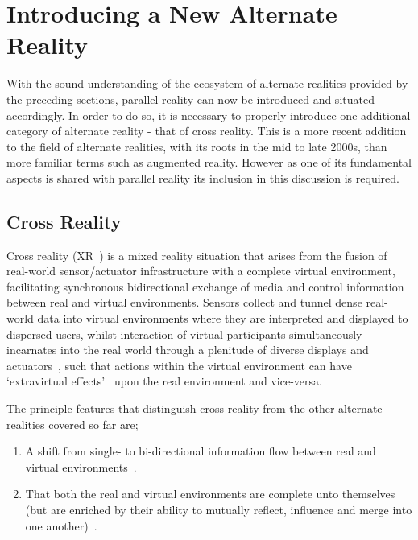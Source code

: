 
\section{Introducing a New Alternate Reality}

With the sound understanding of the ecosystem of alternate realities provided by the preceding sections, parallel reality can now be introduced and situated accordingly. In order to do so, it is necessary to properly introduce one additional category of alternate reality - that of cross reality. This is a more recent addition to the field of alternate realities, with its roots in the mid to late 2000s, than more familiar terms such as augmented reality. However as one of its fundamental aspects is shared with parallel reality its inclusion in this discussion is required.


\subsection{Cross Reality}
\label{sec_crossreality}

\newcommand{\SLfootnote}{\footnote{Second Life.}}

Cross reality (XR~\cite{kim:practical}) is a mixed reality situation that arises from the fusion of real-world sensor/actuator infrastructure with a complete virtual environment, facilitating synchronous bidirectional exchange of media and control information between real and virtual environments. Sensors collect and tunnel dense real-world data into virtual environments where they are interpreted and displayed to dispersed users, whilst interaction of virtual participants simultaneously incarnates into the real world through a plenitude of diverse displays and actuators~\cite{Paradiso2009}, such that actions within the virtual environment can have `extravirtual effects'~\cite{Soraker2010} upon the real environment and vice-versa.

The principle features that distinguish cross reality from the other alternate realities covered so far are;
\begin{enumerate}
	\item A shift from single- to bi-directional information flow between real and virtual environments~\cite{kim:practical}.
	\item That both the real and virtual environments are complete unto themselves (but are enriched by their ability to mutually reflect, influence and merge into one another)~\cite{lifton:merging}.
\end{enumerate}

